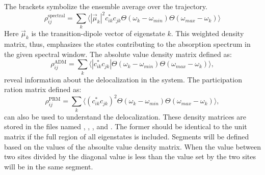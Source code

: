 The brackets symbolize the ensemble average over the trajectory.
\begin{equation}
\rho^{\textrm{spectral}}_{ij}=\sum_k \Big\langle |\vec{\mu}_k|^2 c_{ik}^* c_{jk}  \Theta(\omega_{k}-\omega_{min})\Theta(\omega_{max}-\omega_k)\Big\rangle
\end{equation}
Here $\vec{\mu}_k$ is the transition-dipole vector of eigenstate $k$.
This weighted density matrix, thus, emphasizes the states contributing to the absorption spectrum in the given spectral window.
The absolute value density matrix defined as:
\begin{equation}
	\rho^{\textrm{ADM}}_{ij}=\sum_k \Big\langle |c_{ik}^* c_{jk}|  \Theta(\omega_{k}-\omega_{min})\Theta(\omega_{max}-\omega_k)\Big\rangle,
\end{equation}
reveal information about the delocalization in the system.
The participation ration matrix defined as:
\begin{equation}
	\rho^{\textrm{PRM}}_{ij}=\sum_k \Big\langle (c_{ik}^* c_{jk})^2  \Theta(\omega_{k}-\omega_{min})\Theta(\omega_{max}-\omega_k)\Big\rangle,
\end{equation}
can also be used to understand the delocalization.
These density matrices are stored in the files named , , , and .
The former should be identical to the unit matrix if the full region of all eigenstates is included.
Segments will be defined based on the values of the absoulte value density matrix.
When the value between two sites divided by the diagonal value is less than the value set by  the two sites will be in the same segment. 


